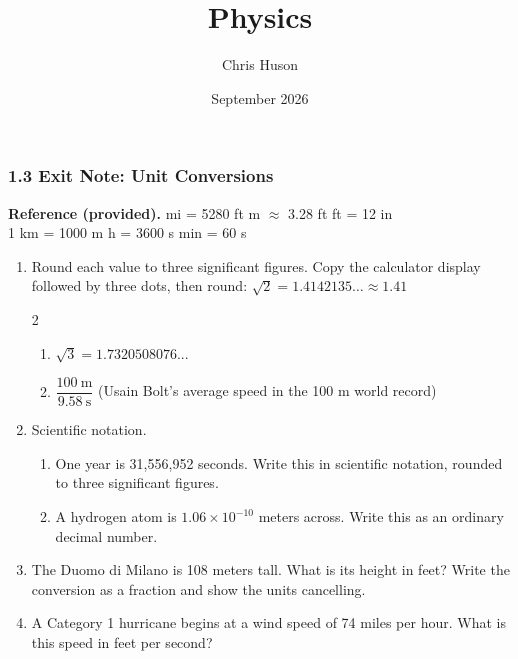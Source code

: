 \documentclass[12pt, twoside]{article}
\title{Physics}
\author{Chris Huson}
\date{September 2026}
\begin{document}
\subsubsection*{1.3 Exit Note: Unit Conversions}

\textbf{Reference (provided).}  mi = 5280 ft  m $\approx$ 3.28 ft  ft = 12 in \\
1 km = 1000 m  h = 3600 s  min = 60 s

\vspace{0.35cm}

\begin{enumerate}[itemsep=0.7cm]

\item Round each value to three significant figures. Copy the calculator display
  followed by three dots, then round: $\sqrt{2} = 1.4142135\ldots \approx 1.41$
  \begin{multicols}{2}
    \begin{enumerate}[itemsep=1.5cm]
      \item $\sqrt{3}= 1.7320508076...$
      \item $\dfrac{100~\text{m}}{9.58~\text{s}}$ \quad (Usain Bolt's average speed
        in the 100 m world record)
    \end{enumerate}
  \end{multicols} \vspace{0.5cm}

\item Scientific notation.
  \begin{enumerate}[itemsep=2.2cm]
    \item One year is 31{,}556{,}952 seconds. Write this in scientific notation,
      rounded to three significant figures.
    \item A hydrogen atom is $1.06 \times 10^{-10}$ meters across. Write this as an
      ordinary decimal number.
  \end{enumerate} \vspace{2.0cm}

\item The Duomo di Milano is 108 meters tall. What is its height in feet? Write the
  conversion as a fraction and show the units cancelling. \vspace{2cm}

\item A Category 1 hurricane begins at a wind speed of 74 miles per hour. What is
  this speed in feet per second? \vspace{3.4cm}


\end{enumerate}
\end{document}
